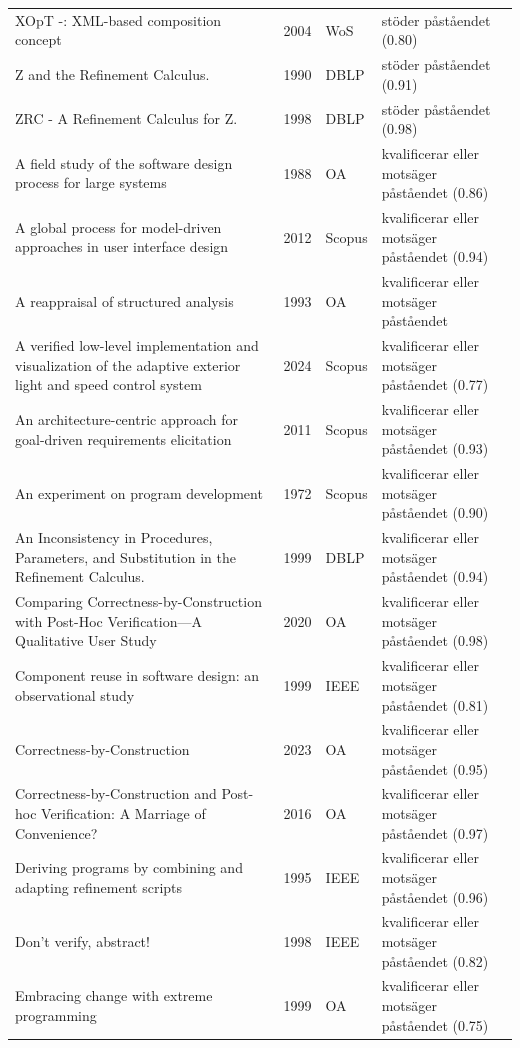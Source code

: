 \begin{longtable}{@{}%
  >{\raggedright\arraybackslash}p{}c%
  >{\raggedright\arraybackslash}p{}%
  >{\raggedright\arraybackslash}p{}@{}}
XOpT -: XML-based composition concept & 2004 & WoS & stöder påståendet (0.80) \\
Z and the Refinement Calculus. & 1990 & DBLP & stöder påståendet (0.91) \\
ZRC - A Refinement Calculus for Z. & 1998 & DBLP & stöder påståendet (0.98) \\
A field study of the software design process for large systems & 1988 & OA & kvalificerar eller motsäger påståendet (0.86) \\
A global process for model-driven approaches in user interface design & 2012 & Scopus & kvalificerar eller motsäger påståendet (0.94) \\
A reappraisal of structured analysis & 1993 & OA & kvalificerar eller motsäger påståendet \\
A verified low-level implementation and visualization of the adaptive exterior light and speed control system & 2024 & Scopus & kvalificerar eller motsäger påståendet (0.77) \\
An architecture-centric approach for goal-driven requirements elicitation & 2011 & Scopus & kvalificerar eller motsäger påståendet (0.93) \\
An experiment on program development & 1972 & Scopus & kvalificerar eller motsäger påståendet (0.90) \\
An Inconsistency in Procedures, Parameters, and Substitution in the Refinement Calculus. & 1999 & DBLP & kvalificerar eller motsäger påståendet (0.94) \\
Comparing Correctness-by-Construction with Post-Hoc Verification---A Qualitative User Study & 2020 & OA & kvalificerar eller motsäger påståendet (0.98) \\
Component reuse in software design: an observational study & 1999 & IEEE & kvalificerar eller motsäger påståendet (0.81) \\
Correctness-by-Construction & 2023 & OA & kvalificerar eller motsäger påståendet (0.95) \\
Correctness-by-Construction and Post-hoc Verification: A Marriage of Convenience? & 2016 & OA & kvalificerar eller motsäger påståendet (0.97) \\
Deriving programs by combining and adapting refinement scripts & 1995 & IEEE & kvalificerar eller motsäger påståendet (0.96) \\
Don't verify, abstract! & 1998 & IEEE & kvalificerar eller motsäger påståendet (0.82) \\
Embracing change with extreme programming & 1999 & OA & kvalificerar eller motsäger påståendet (0.75) \\

\end{longtable}
